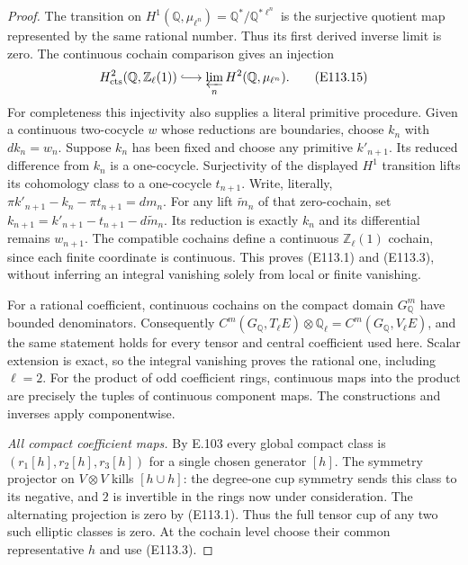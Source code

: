 \begin{proof}
The transition on
$H^1(\mathbb Q,\mu_{\ell^n})=\mathbb Q^*/\mathbb Q^{*\ell^n}$
is the surjective quotient map represented by the same rational
number.  Thus its first derived inverse limit is zero.  The
continuous cochain comparison gives an injection
\[
 H^2_{\rm cts}(\mathbb Q,\mathbb Z_\ell(1))
       \lhook\joinrel\longrightarrow
       \varprojlim_n H^2(\mathbb Q,\mu_{\ell^n}).
 \tag{E113.15}
\]
For completeness this injectivity also supplies a literal
primitive procedure.  Given a continuous two-cocycle $w$ whose
reductions are boundaries, choose $k_n$ with $dk_n=w_n$.
Suppose $k_n$ has been fixed and choose any primitive
$k'_{n+1}$.  Its reduced difference from $k_n$ is a one-cocycle.
Surjectivity of the displayed $H^1$ transition lifts its
cohomology class to a one-cocycle $t_{n+1}$.  Write, literally,
$\pi k'_{n+1}-k_n-\pi t_{n+1}=dm_n$.
For any lift $\widetilde m_n$ of that zero-cochain, set
$k_{n+1}=k'_{n+1}-t_{n+1}-d\widetilde m_n$.
Its reduction is exactly $k_n$ and its differential remains
$w_{n+1}$.
The compatible cochains define a continuous $\mathbb Z_\ell(1)$
cochain, since each finite coordinate is continuous.
This proves (E113.1) and (E113.3), without inferring an integral
vanishing solely from local or finite vanishing.

For a rational coefficient, continuous cochains on the compact
domain $G_{\mathbb Q}^m$ have bounded denominators.  Consequently
$C^m(G_{\mathbb Q},T_\ell E)\otimes\mathbb Q_\ell
=C^m(G_{\mathbb Q},V_\ell E)$, and the same statement holds
for every tensor and central coefficient used here.
Scalar extension is exact, so the integral vanishing proves
the rational one, including $\ell=2$.
For the product of odd coefficient rings, continuous maps into
the product are precisely the tuples of continuous component
maps.  The constructions and inverses apply componentwise.

\emph{All compact coefficient maps.}
By E.103 every global compact class is
$(r_1[h],r_2[h],r_3[h])$ for a single chosen generator $[h]$.
The symmetry projector on $V\otimes V$ kills $[h\cup h]$:
the degree-one cup symmetry sends this class to its negative,
and $2$ is invertible in the rings now under consideration.
The alternating projection is zero by (E113.1).
Thus the full tensor cup of any two such elliptic classes is
zero.  At the cochain level choose their common representative
$h$ and use (E113.3).


\end{proof}
